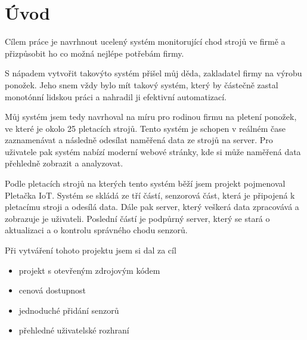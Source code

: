 \chapter*{Úvod}


Cílem práce je navrhnout ucelený systém monitorující chod 
\fxnote[author=JPA]{\textcolor{mygreen}{Jakých stojů? Co takhle přidat "střádacích" nebo něco v tomto stylu?}} strojů ve firmě a přizpůsobit ho co možná nejlépe potřebám firmy.

S nápadem vytvořit takovýto systém přišel můj děda, zakladatel firmy na výrobu ponožek.
Jeho snem vždy bylo mít takový systém, který by částečně zastal monotónní lidskou práci a nahradil ji efektivní automatizací.

Můj systém jsem tedy navrhoval na míru pro rodinou firmu na pletení ponožek, ve které je okolo 25 pletacích strojů. 
Tento systém je schopen v reálném čase zaznamenávat a následně odesílat naměřená data ze strojů na server. 
Pro uživatele pak systém nabízí moderní webové stránky, kde si může naměřená data přehledně zobrazit a analyzovat.

Podle pletacích strojů na kterých tento systém běží jsem projekt pojmenoval Pletačka IoT. 
Systém se skládá ze tří částí, senzorová část, která je připojená k pletacímu stroji a odesílá data.
Dále pak server, který veškerá data zpracovává a zobrazuje je uživateli.
Poslední částí je podpůrný server, který se stará o aktualizaci a o kontrolu správného chodu senzorů.\newline



Při vytváření tohoto projektu jsem si dal za cíl
\begin{itemize}
    \item projekt s otevřeným zdrojovým kódem
    \item cenová dostupnost
    \item jednoduché přidání senzorů
    \item přehledné uživatelské rozhraní
\end{itemize}

\newpage
